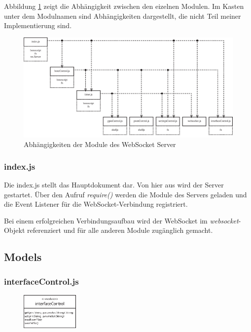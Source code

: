 Abbildung \ref{fig:wssDependencies} zeigt die Abhängigkeit zwischen den eizelnen Modulen. Im Kasten unter dem Modulnamen sind Abhängigkeiten dargestellt, die nicht Teil meiner Implementierung sind.

\begin{figure}[ht]
  \centering
  \includegraphics[width = \textwidth]{dokumentation/images/wssDependencies.eps}
  \caption{Abhängigkeiten der Module des WebSocket Server}
  \label{fig:wssDependencies}
\end{figure}

\subsubsection{index.js}
Die index.js stellt das Hauptdokument dar. Von hier aus wird der Server gestartet. Über den Aufruf \textit{require()} werden die Module des Servers geladen und die Event Listener für die WebSocket-Verbindung registriert.

Bei einem erfolgreichen Verbindungsaufbau wird der WebSocket im \textit{websocket}-Objekt referenziert und für alle anderen Module zugänglich gemacht.


\subsection{Models}

\subsubsection{interfaceControl.js}
\begin{figure}
  \vspace{-16pt}
  \centering
  \includegraphics[width = 0.25\textwidth]{dokumentation/images/apiInterfaceControl.eps}
\end{figure}

